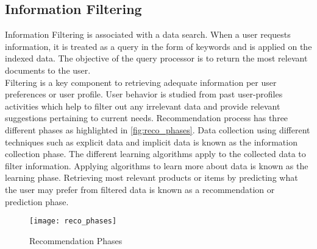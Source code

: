 \subsection{Information Filtering}

Information Filtering is associated with a data search. When a user requests information, it is treated as a query in the form of keywords and is applied on the indexed data. The objective of the query processor is to return the most relevant documents to the user.
\\
\noindent Filtering is a key component to retrieving adequate information per user preferences or user profile. User behavior is studied from past user-profiles activities which help to filter out any irrelevant data and provide relevant suggestions pertaining to current needs.
Recommendation process has three different phases as highlighted in \autoref{fig:reco_phases}. Data collection using different techniques such as explicit data and implicit data is known as the information collection phase. The different learning algorithms apply to the collected data to filter information. Applying algorithms to learn more about data is known as the learning phase.
Retrieving most relevant products or items by predicting what the user may prefer from filtered data is known as a recommendation or prediction phase.
\\
\begin{figure}[H]
	\centering
	\texttt{[image: reco\_phases]}
	\caption{Recommendation Phases \cite{33}}
	\label{fig:reco_phases}
\end{figure}
